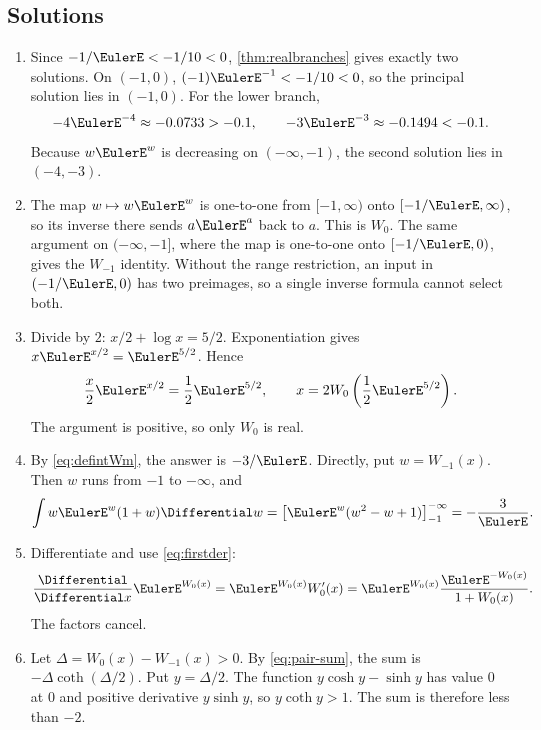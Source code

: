 \documentclass[11pt]{article}
\theoremstyle{remark}
\begin{document}
\subsection*{Solutions}
\begin{enumerate}[label=\textbf{S\arabic*.},leftmargin=*]
\item Since \(-1/\EulerE<-1/10<0\), \cref{thm:realbranches} gives exactly two
solutions.  On \((-1,0)\),
\((-1)\EulerE^{-1}<-1/10<0\), so the principal solution lies in \((-1,0)\).
For the lower branch,
\[-4\EulerE^{-4}\approx-0.0733>-0.1,
  \qquad -3\EulerE^{-3}\approx-0.1494<-0.1.
\]
Because \(w\EulerE^w\) is decreasing on \(( -\infty,-1)\), the second solution
lies in \((-4,-3)\).

\item The map \(w\mapsto w\EulerE^w\) is one-to-one from \([-1,\infty)\) onto
\([-1/\EulerE,\infty)\), so its inverse there sends \(a\EulerE^a\) back to \(a\).
This is \(W_0\).  The same argument on \(( -\infty,-1]\), where the map is
one-to-one onto \([-1/\EulerE,0)\), gives the \(W_{-1}\) identity.  Without the
range restriction, an input in \((-1/\EulerE,0)\) has two preimages, so a single
inverse formula cannot select both.

\item Divide by \(2\): \(x/2+\log x=5/2\).  Exponentiation gives
\(x\EulerE^{x/2}=\EulerE^{5/2}\).  Hence
\[
       \frac{x}{2}\EulerE^{x/2}=\frac12\EulerE^{5/2},
       \qquad
       x=2W_0\left(\frac12\EulerE^{5/2}\right).
\]
The argument is positive, so only \(W_0\) is real.

\item By \eqref{eq:defintWm}, the answer is \(-3/\EulerE\).  Directly, put
\(w=W_{-1}(x)\).  Then \(w\) runs from \(-1\) to \(-\infty\), and
\[
 \int w\EulerE^w(1+w)\Differential w
 =\left[\EulerE^w(w^2-w+1)\right]_{-1}^{-\infty}
 =-\frac3\EulerE.
\]

\item Differentiate and use \eqref{eq:firstder}:
\[
 \frac{\Differential}{\Differential x}\EulerE^{W_0(x)}
 =\EulerE^{W_0(x)}W_0'(x)
 =\EulerE^{W_0(x)}\frac{\EulerE^{-W_0(x)}}{1+W_0(x)}.
\]
The factors cancel.

\item Let \(\Delta=W_0(x)-W_{-1}(x)>0\).  By
\eqref{eq:pair-sum}, the sum is
\(-\Delta\coth(\Delta/2)\).  Put \(y=\Delta/2\).  The function
\(y\cosh y-\sinh y\) has value \(0\) at \(0\) and positive derivative
\(y\sinh y\), so \(y\coth y>1\).  The sum is therefore less than \(-2\).


\end{enumerate}
\end{document}
